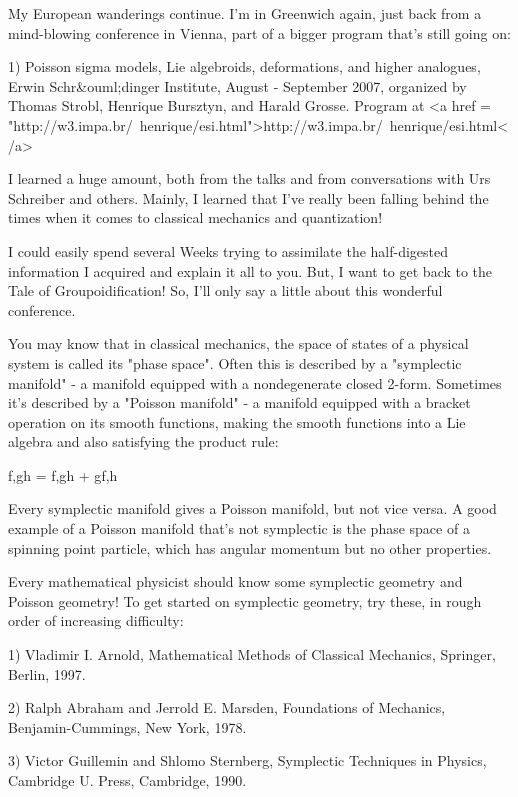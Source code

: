 


My European wanderings continue.  I'm in Greenwich again, just back 
from a mind-blowing conference in Vienna, part of a bigger program 
that's still going on:

1) Poisson sigma models, Lie algebroids, deformations, and higher 
analogues, Erwin Schr&ouml;dinger Institute, August - September 2007,
organized by Thomas Strobl, Henrique Bursztyn, and Harald Grosse.
Program at <a href = "http://w3.impa.br/~henrique/esi.html">http://w3.impa.br/~henrique/esi.html</a>

I learned a huge amount, both from the talks and from conversations
with Urs Schreiber and others.  Mainly, I learned that I've really 
been falling behind the times when it comes to classical mechanics 
and quantization!

I could easily spend several Weeks trying to assimilate the 
half-digested information I acquired and explain it all to you.  
But, I want to get back to the Tale of Groupoidification!  So, 
I'll only say a little about this wonderful conference.

You may know that in classical mechanics, the space of states of a
physical system is called its "phase space".  Often this is
described by a "symplectic manifold" - a manifold equipped
with a nondegenerate closed 2-form.  Sometimes it's described by a
"Poisson manifold" - a manifold equipped with a bracket
operation on its smooth functions, making the smooth functions into a
Lie algebra and also satisfying the product rule:

{f,gh} = {f,g}h + g{f,h}

Every symplectic manifold gives a Poisson manifold, but not vice
versa.  A good example of a Poisson manifold that's not symplectic
is the phase space of a spinning point particle, which has angular
momentum but no other properties.

Every mathematical physicist should know some symplectic geometry 
and Poisson geometry!  To get started on symplectic geometry, try 
these, in rough order of increasing difficulty:

1) Vladimir I. Arnold, Mathematical Methods of Classical Mechanics,
Springer, Berlin, 1997.
 
2) Ralph Abraham and Jerrold E. Marsden, Foundations of Mechanics, 
Benjamin-Cummings, New York, 1978.

3) Victor Guillemin and Shlomo Sternberg, Symplectic Techniques
in Physics, Cambridge U. Press, Cambridge, 1990.

